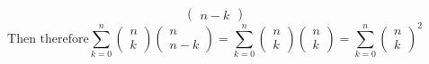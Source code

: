 \documentclass{report}
\begin{document}
\begin{enumerate}
$$\begin{pmatrix}
        n - k
        \end{pmatrix}$$
	$$\text{Then therefore}\sum_{k=0}^{n}
        \begin{pmatrix}
        n \\
        k
        \end{pmatrix}
        \begin{pmatrix}
        n \\
        n - k
        \end{pmatrix}
        =\sum_{k=0}^{n}
        \begin{pmatrix}
        n \\
        k
        \end{pmatrix}
        \begin{pmatrix}
        n \\
        k
        \end{pmatrix}
        =\sum_{k=0}^{n}
        \begin{pmatrix}
        n \\
        k
        \end{pmatrix}^2
    $$
\end{enumerate}

\noindent
\end{document}
